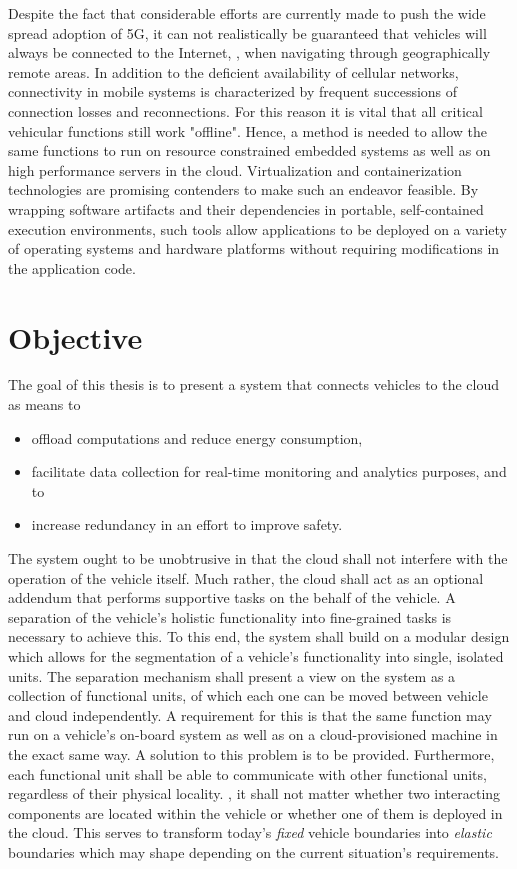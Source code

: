 Despite the fact that considerable efforts are currently made to push the wide spread adoption of 5G, it can not realistically be guaranteed that vehicles will always be connected to the Internet, \eg , when navigating through geographically remote areas. In addition to the deficient availability of cellular networks, connectivity in mobile systems is characterized by frequent successions of connection losses and reconnections. For this reason it is vital that all critical vehicular functions still work "offline". Hence, a method is needed to allow the same functions to run on resource constrained embedded systems as well as on high performance servers in the cloud. Virtualization and containerization technologies are promising contenders to make such an endeavor feasible. By wrapping software artifacts and their dependencies in portable, self-contained execution environments, such tools allow applications to be deployed on a variety of operating systems and hardware platforms without requiring modifications in the application code.

%
%
%
%
%
%
%
%
%
%

\section{Objective}
The goal of this thesis is to present a system that connects vehicles to the cloud as means to \begin{itemize}
\item offload computations and reduce energy consumption,
\item facilitate data collection for real-time monitoring and analytics purposes, and to
\item increase redundancy in an effort to improve safety.
\end{itemize} 
The system ought to be unobtrusive in that the cloud shall not interfere with the operation of the vehicle itself. Much rather, the cloud shall act as an optional addendum that performs supportive tasks on the behalf of the vehicle. A separation of the vehicle's holistic functionality into fine-grained tasks is necessary to achieve this. To this end, the system shall build on a modular design which allows for the segmentation of a vehicle's functionality into single, isolated units. The separation mechanism shall present a view on the system as a collection of functional units, of which each one can be moved between vehicle and cloud independently. A requirement for this is that the same function may run on a vehicle's on-board system as well as on a cloud-provisioned machine in the exact same way. A solution to this problem is to be provided. Furthermore, each functional unit shall be able to communicate with other functional units, regardless of their physical locality. \Ie , it shall not matter whether two interacting components are located within the vehicle or whether one of them is deployed in the cloud. This serves to transform today's \emph{fixed} vehicle boundaries into \emph{elastic} boundaries which may shape depending on the current situation's requirements.

